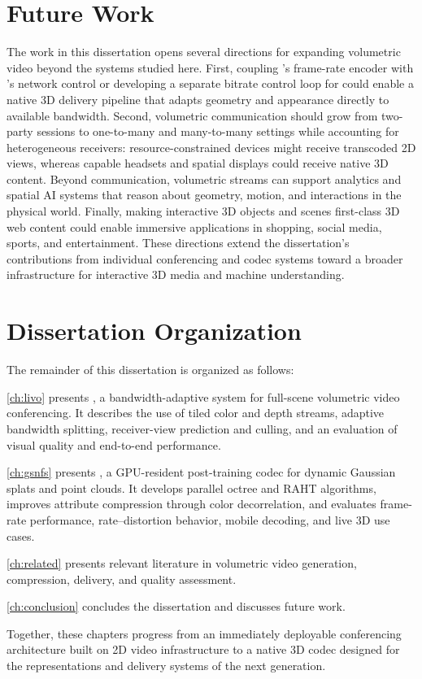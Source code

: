 \section{Future Work}
\label{sec:intro_v2_future_work}

The work in this dissertation opens several directions for expanding volumetric video beyond the systems studied here. 
%
First, coupling \gsnfs's frame-rate encoder with \livo's network control or developing a separate bitrate control loop for \gsnfs could enable a native 3D delivery pipeline that adapts geometry and appearance directly to available bandwidth. 
%
Second, volumetric communication should grow from two-party sessions to one-to-many and many-to-many settings while accounting for heterogeneous receivers: resource-constrained devices might receive transcoded 2D views, whereas capable headsets and spatial displays could receive native 3D content. 
%
Beyond communication, volumetric streams can support analytics and spatial AI systems that reason about geometry, motion, and interactions in the physical world. 
%
Finally, making interactive 3D objects and scenes first-class 3D web content could enable immersive applications in shopping, social media, sports, and entertainment. 
%
These directions extend the dissertation's contributions from individual conferencing and codec systems toward a broader infrastructure for interactive 3D media and machine understanding.

\section{Dissertation Organization}
\label{sec:intro_v2_organization}

The remainder of this dissertation is organized as follows:

\squishlist
    \item \cref{ch:livo} presents \livo, a bandwidth-adaptive system for full-scene volumetric video conferencing. It describes the use of tiled color and depth streams, adaptive bandwidth splitting, receiver-view prediction and culling, and an evaluation of visual quality and end-to-end performance.

    \item \cref{ch:gsnfs} presents \gsnfs, a GPU-resident post-training codec for dynamic Gaussian splats and point clouds. It develops parallel octree and RAHT algorithms, improves attribute compression through color decorrelation, and evaluates frame-rate performance, rate--distortion behavior, mobile decoding, and live 3D use cases.
    
    \item \cref{ch:related} presents relevant literature in volumetric video generation, compression, delivery, and quality assessment.
    
    \item \cref{ch:conclusion} concludes the dissertation and discusses future work.
\squishend

Together, these chapters progress from an immediately deployable conferencing architecture built on 2D video infrastructure to a native 3D codec designed for the representations and delivery systems of the next generation.
